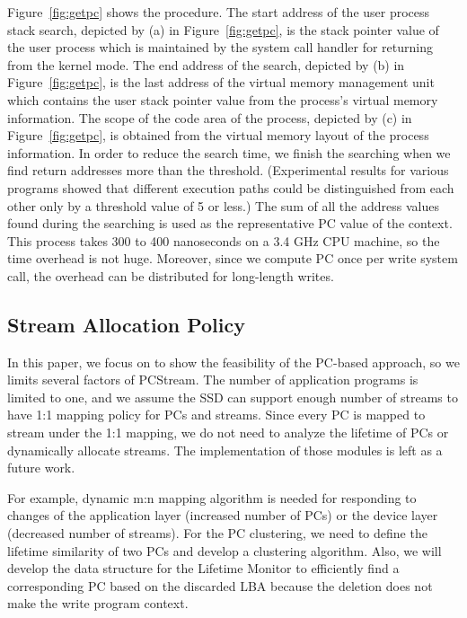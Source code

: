 Figure~\ref{fig:getpc} shows the procedure. 
The start address of the user process stack search, depicted by (a) in Figure~\ref{fig:getpc},
is the stack pointer value of the user process 
which is maintained by the system call handler for returning from the kernel mode. 
The end address of the search, depicted by (b) in Figure~\ref{fig:getpc},
is the last address of the virtual memory management unit which
contains the user stack pointer value
from the process's virtual memory information. 
The scope of the code area of the process, depicted by (c) in Figure~\ref{fig:getpc},
is obtained from the virtual memory layout of the process information. 
In order to reduce the search time, we finish the searching 
when we find return addresses more than the threshold.
(Experimental results for various programs showed that different execution paths could be distinguished 
from each other only by a threshold value of 5 or less.)
The sum of all the address values found during the searching is used 
as the representative PC value of the context.
This process takes 300 to 400 nanoseconds on a 3.4 GHz CPU machine, 
so the time overhead is not huge.
Moreover, since we compute PC once per write system call,
the overhead can be distributed for long-length writes.

\subsection{Stream Allocation Policy}
In this paper, we focus on to show the feasibility of the PC-based approach, 
so we limits several factors of PCStream.
The number of application programs is limited to one, 
and we assume the SSD can support enough number of streams
to have 1:1 mapping policy for PCs and streams.
Since every PC is mapped to stream under the 1:1 mapping, 
we do not need to analyze the lifetime of PCs 
or dynamically allocate streams.
The implementation of those modules 
is left as a future work. 

For example, dynamic m:n mapping algorithm is
needed for responding to changes of
the application layer (increased number of PCs)
or the device layer (decreased number of streams).
For the PC clustering, we need to define the lifetime similarity of two PCs
and develop a clustering algorithm.
Also, we will develop the data structure
for the Lifetime Monitor to efficiently find a corresponding PC 
based on the discarded LBA because the deletion does not
make the write program context.

